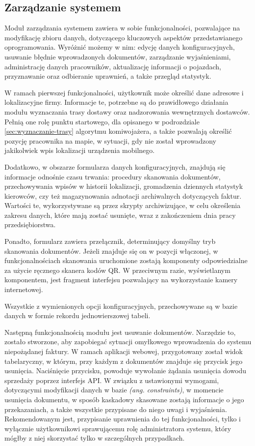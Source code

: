 \subsection{Zarządzanie systemem}
Moduł zarządzania systemem zawiera w sobie funkcjonalności, pozwalające na modyfikację zbioru danych, dotyczącego kluczowych aspektów przedstawianego oprogramowania. Wyróżnić możemy w nim: edycję danych konfiguracyjnych, usuwanie błędnie wprowadzonych dokumentów, zarządzanie wyjaśnieniami, administrację danych pracowników, aktualizację informacji o pojazdach, przyznawanie oraz odbieranie uprawnień, a także przegląd statystyk.

W ramach pierwszej funkcjonalności, użytkownik może określić dane adresowe i lokalizacyjne firmy. Informacje te, potrzebne są do prawidłowego działania modułu wyznaczania trasy dostawy oraz nadzorowania wewnętrznych dostawców. Pełnią one rolę punktu startowego, dla opisanego w podrozdziale \ref{sec:wyznaczanie-trasy} algorytmu komiwojażera, a także pozwalają określić pozycję pracownika na mapie, w sytuacji, gdy nie został wprowadzony jakikolwiek wpis lokalizacji urządzenia mobilnego.

Dodatkowo, w obszarze formularza danych konfiguracyjnych, znajdują się informacje odnośnie czasu trwania: procedury skanowania dokumentów, przechowywania wpisów w historii lokalizacji, gromadzenia dziennych statystyk kierowców, czy też magazynowania adnotacji archiwalnych dotyczących faktur. Wartości te, wykorzystywane są przez skrypty archiwizujące, w celu określenia zakresu danych, które mają zostać usunięte, wraz z zakończeniem dnia pracy przedsiębiorstwa.

Ponadto, formularz zawiera przełącznik, determinujący domyślny tryb skanowania dokumentów. Jeżeli znajduje się on w pozycji włączonej, w funkcjonalnościach skanowania uruchomione zostają komponenty odpowiedzialne za użycie ręcznego skanera kodów QR. W przeciwnym razie, wyświetlanym komponentem, jest fragment interfejsu pozwalający na wykorzystanie kamery internetowej.

Wszystkie z wymienionych opcji konfiguracyjnych, przechowywane są w bazie danych w formie rekordu jednowierszowej tabeli.

Następną funkcjonalnością modułu jest usuwanie dokumentów. Narzędzie to, zostało stworzone, aby zapobiegać sytuacji omyłkowego wprowadzenia do systemu niepożądanej faktury. W ramach aplikacji webowej, przygotowany został widok tabelaryczny, w którym, przy każdym z dokumentów znajduje się przycisk jego usunięcia. Naciśnięcie przycisku, powoduje wywołanie żądania usunięcia dowodu sprzedaży poprzez interfejs API. W związku z ustawionymi wymogami, dotyczącymi modyfikacji danych w bazie \textit{(ang. constraints)}, w momencie usunięcia dokumentu, w sposób kaskadowy skasowane zostają informacje o jego przekazaniach, a także wszystkie przypisane do niego uwagi i wyjaśnienia. Rekomendowanym jest, przypisanie uprawnienia do tej funkcjonalności, tylko i wyłącznie użytkownikowi sprawującemu rolę administratora systemu, który mógłby z niej skorzystać tylko w szczególnych przypadkach.

